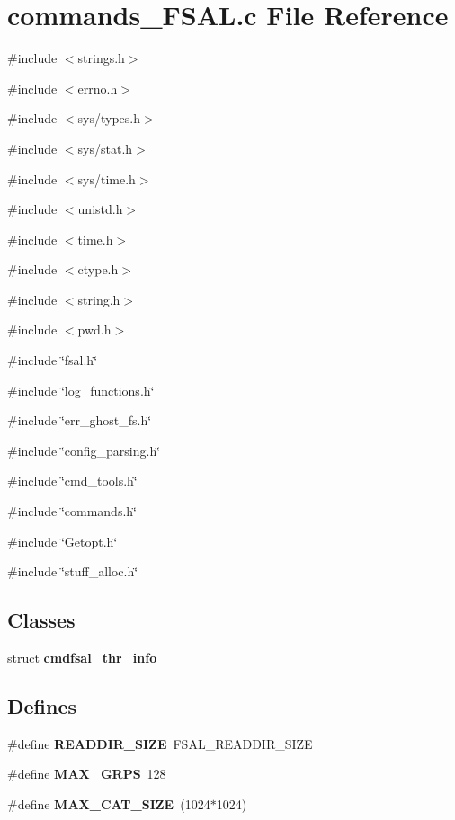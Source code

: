 \section{commands\_\-FSAL.c File Reference}
\label{commands__FSAL_8c}
{\ttfamily \#include $<$strings.h$>$}\par
{\ttfamily \#include $<$errno.h$>$}\par
{\ttfamily \#include $<$sys/types.h$>$}\par
{\ttfamily \#include $<$sys/stat.h$>$}\par
{\ttfamily \#include $<$sys/time.h$>$}\par
{\ttfamily \#include $<$unistd.h$>$}\par
{\ttfamily \#include $<$time.h$>$}\par
{\ttfamily \#include $<$ctype.h$>$}\par
{\ttfamily \#include $<$string.h$>$}\par
{\ttfamily \#include $<$pwd.h$>$}\par
{\ttfamily \#include \char`\"{}fsal.h\char`\"{}}\par
{\ttfamily \#include \char`\"{}log\_\-functions.h\char`\"{}}\par
{\ttfamily \#include \char`\"{}err\_\-ghost\_\-fs.h\char`\"{}}\par
{\ttfamily \#include \char`\"{}config\_\-parsing.h\char`\"{}}\par
{\ttfamily \#include \char`\"{}cmd\_\-tools.h\char`\"{}}\par
{\ttfamily \#include \char`\"{}commands.h\char`\"{}}\par
{\ttfamily \#include \char`\"{}Getopt.h\char`\"{}}\par
{\ttfamily \#include \char`\"{}stuff\_\-alloc.h\char`\"{}}\par
\subsection*{Classes}
\begin{DoxyCompactItemize}
\item 
struct {\bf cmdfsal\_\-thr\_\-info\_\-\_\-}
\end{DoxyCompactItemize}
\subsection*{Defines}
\begin{DoxyCompactItemize}
\item 
\#define {\bf READDIR\_\-SIZE}~FSAL\_\-READDIR\_\-SIZE
\item 
\#define {\bf MAX\_\-GRPS}~128
\item 
\#define {\bf MAX\_\-CAT\_\-SIZE}~(1024$\ast$1024)
\end{DoxyCompactItemize}
